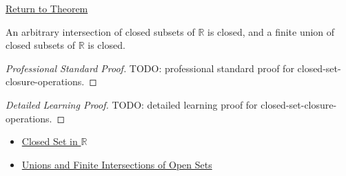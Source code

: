 \newpage
{}
\label{prf:closed-set-closure-operations}

\begin{remark*}[Return]
\hyperref[thm:closed-set-closure-operations]{Return to Theorem}
\end{remark*}

\begin{theorem*}
An arbitrary intersection of closed subsets of $\mathbb{R}$ is closed, and a finite union of closed subsets of $\mathbb{R}$ is closed.
\end{theorem*}

\begin{proof}[Professional Standard Proof]
\LRAProofBodyStart
TODO: professional standard proof for closed-set-closure-operations.
\end{proof}

\begin{proof}[Detailed Learning Proof]
\LRAProofBodyStart
TODO: detailed learning proof for closed-set-closure-operations.
\end{proof}

\begin{remark*}
\end{remark*}

\begin{dependencies}
\begin{itemize}
  \item \hyperref[def:closed-set]{Closed Set in $\mathbb{R}$}
  \item \hyperref[thm:open-set-closure-operations]{Unions and Finite Intersections of Open Sets}
\end{itemize}
\end{dependencies}

\clearpage
